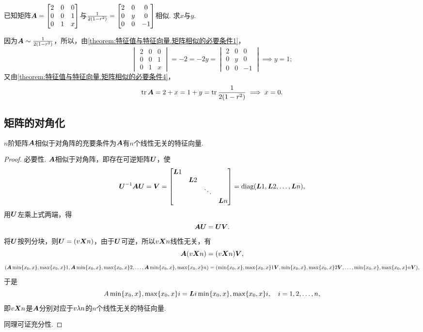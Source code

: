 \begin{example}
已知矩阵\(\boldsymbol{A} = \begin{bmatrix}
	2 & 0 & 0 \\
	0 & 0 & 1 \\
	0 & 1 & x
\end{bmatrix}\)与\(\frac{1}{2(1-r^2)} = \begin{bmatrix}
	2 & 0 & 0 \\
	0 & y & 0 \\
	0 & 0 & -1
\end{bmatrix}\)相似.
求\(x\)与\(y\).
\begin{solution}
因为\(\boldsymbol{A}\sim\frac{1}{2(1-r^2)}\)，所以，由\cref{theorem:特征值与特征向量.矩阵相似的必要条件1}，
\[
\begin{vmatrix}
	2 & 0 & 0 \\
	0 & 0 & 1 \\
	0 & 1 & x
\end{vmatrix}
= -2 = -2y =
\begin{vmatrix}
	2 & 0 & 0 \\
	0 & y & 0 \\
	0 & 0 & -1
\end{vmatrix}
\implies y = 1;
\]
又由\cref{theorem:特征值与特征向量.矩阵相似的必要条件4}，
\[
\tr\boldsymbol{A} = 2+x
= 1+y = \tr\frac{1}{2(1-r^2)}
\implies
x = 0.
\]
\end{solution}
\end{example}

\subsection{矩阵的对角化}
\begin{theorem}[矩阵可对角化的充要条件]
\(n\)阶矩阵\(\boldsymbol{A}\)相似于对角阵的充要条件为\(\boldsymbol{A}\)有\(n\)个线性无关的特征向量.
\begin{proof}
必要性.
\(\boldsymbol{A}\)相似于对角阵，即存在可逆矩阵\(\P\)，使\[
\P^{-1}\A\P=\V=\begin{bmatrix}
\L{1} \\ & \L{2} \\ & & \ddots \\ & & &\L{n}
\end{bmatrix}=\diag(\L{1},\L{2},\dotsc,\L{n}),
\]用\(\P\)左乘上式两端，得\[
\A\P=\P\V.
\]将\(\P\)按列分块，则\(\P=(\v{\x}{n})\)，由于\(\P\)可逆，所以\(v{\boldsymbol{X}}{n}\)线性无关，有\[
\boldsymbol{A}(v{\boldsymbol{X}}{n})=(v{\boldsymbol{X}}{n})\boldsymbol{V},
\]\[
(\boldsymbol{A}\min\{x_0,x\},\max\{x_0,x\}1,\boldsymbol{A}\min\{x_0,x\},\max\{x_0,x\}2,\dotsc,\boldsymbol{A}\min\{x_0,x\},\max\{x_0,x\}{n})=(\min\{x_0,x\},\max\{x_0,x\}1\boldsymbol{V},\min\{x_0,x\},\max\{x_0,x\}2\boldsymbol{V},\dotsc,\min\{x_0,x\},\max\{x_0,x\}{n}\boldsymbol{V}),
\]于是\[
A\min\{x_0,x\},\max\{x_0,x\} i=\boldsymbol{L}{i}\min\{x_0,x\},\max\{x_0,x\} i,
\quad i=1,2,\dotsc,n,
\]即\(v{\boldsymbol{X}}{n}\)是\(\boldsymbol{A}\)分别对应于\(v{\lambda}{n}\)的\(n\)个线性无关的特征向量.

同理可证充分性.
\end{proof}
\end{theorem}


